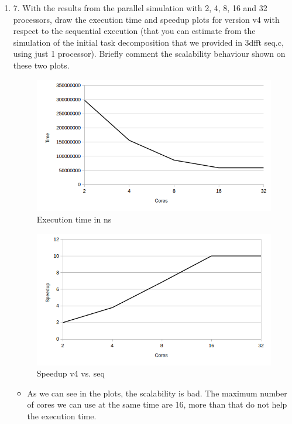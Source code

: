 \documentclass[12pt]{article}
\begin{document}
\begin{enumerate}
\begin{center}
\begin{tabular}{| c || c | c | c | }
\end{tabular}
\end{center}



\item[] 7. With the results from the parallel simulation with 2, 4, 8, 16 and 32 processors, draw the execution
time and speedup plots for version v4 with respect to the sequential execution (that you can
estimate from the simulation of the initial task decomposition that we provided in 3dfft seq.c,
using just 1 processor). Briefly comment the scalability behaviour shown on these two plots.


\begin{figure}[H]%
\centering
\includegraphics[width=12cm]{plotTimeCores.png}
\caption{Execution time in ns }
\label{fig:test}%
\end{figure}
\begin{figure}[H]
\centering
\includegraphics[width=12cm]{plotSpeedup.png}
\caption{Speedup v4 vs. seq}
\label{fig:Speedup plot}%
\end{figure}

\begin{itemize}
	\item[] As we can see in the plots, the scalability is bad. The maximum number of cores we can use at the same time are 16, more than that do not help the execution time.
\end{itemize}


\end{enumerate}
\end{document}
